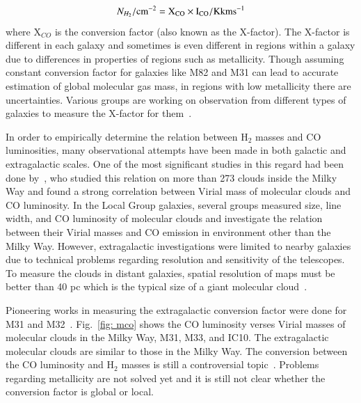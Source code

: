 \begin{equation}
N_{H_2}/\rm cm^{-2} = X_{CO} \times I_{CO}/\rm K km s^{-1}
\end{equation}
where X$_{CO}$ is the conversion factor (also known as the X-factor).
The X-factor is different in each galaxy and sometimes is even different in regions within a galaxy due to differences in properties of regions such as metallicity. 
Though assuming constant conversion factor for galaxies like M82 and M31 can lead to accurate estimation of global molecular gas mass, in regions with low metallicity there are uncertainties. 
Various groups are working on observation from different types of galaxies to measure the X-factor for them~\citep{Wilson95, Bosselli02, Bolato13}.

In order to empirically determine the relation between H$_2$ masses and CO luminosities, many observational attempts have been made in both galactic and extragalactic scales. 
One of the most significant studies in this regard had been done by~\cite{Solomon87}, who studied this relation on more than 273 clouds inside the Milky Way and found a strong correlation between Virial mass of molecular clouds and CO luminosity. 
In the Local Group galaxies, several groups measured size, line width, and CO luminosity of molecular clouds and investigate the relation between  their Virial masses and CO emission in environment other than the Milky Way. However, extragalactic investigations were limited to nearby galaxies due to technical problems regarding resolution and sensitivity of the telescopes. 
To measure the clouds in distant galaxies, spatial resolution of maps must be better than 40 pc which is the typical size of a giant molecular cloud~\citep[e.g.][and refrences therein]{Bolato13}. 

Pioneering works in measuring the extragalactic conversion factor were done for M31 and M32~\citep[e.g.,][]{Wilson89, Wilson90}. 
Fig.~\ref{fig: mco} shows the CO luminosity verses Virial masses of molecular clouds in the Milky Way, M31, M33, and IC10. 
The extragalactic molecular clouds are similar to those in the Milky Way. 
The conversion between the CO luminosity and H$_2$ masses is still a controversial topic~\citep[e.g.][]{Narayanan11, Bolato13, Sandstrom13}.
Problems regarding metallicity are not solved yet and it is still not clear whether the conversion factor is global or local. 

